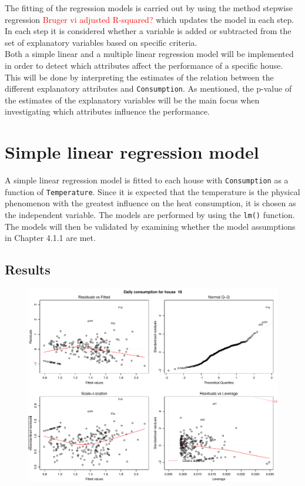 \noindent The fitting of the regression models is carried out by using the method stepwise regression \textcolor{red}{Bruger vi adjusted R-squared?} which updates the model in each step. In each step it is considered whether a variable is added or subtracted from the set of explanatory variables based on specific criteria. \\

\noindent Both a simple linear and a multiple linear regression model will be implemented in order to detect which attributes affect the performance of a specific house. This will be done by interpreting the estimates of the relation between the different explanatory attributes and \texttt{Consumption}. As mentioned, the p-value of the estimates of the explanatory variables will be the main focus when investigating which attributes influence the performance. 

\section{Simple linear regression model}
A simple linear regression model is fitted to each house with \texttt{Consumption} as a function of \texttt{Temperature}. Since it is expected that the temperature is the physical phenomenon with the greatest influence on the heat consumption, it is chosen as the independent variable. The models are performed by using the \texttt{lm()} function. The models will then be validated by examining whether the model assumptions in Chapter 4.1.1 are met. \\

\noindent 

\subsection{Results}
\begin{figure}
    \centering
    \includegraphics[width=.8\textwidth]{../../../figures/simple_lm18.pdf}
    \caption{}
    \label{fig: simple_lm_18}
\end{figure}

